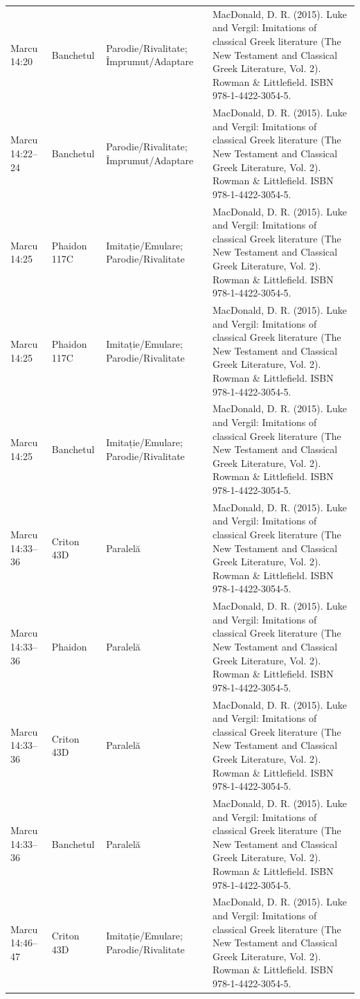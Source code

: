 \documentclass[12pt,a4paper,twoside,openany]{book}
\begin{document}
\begin{longtable}{L{1.4cm}L{1.7cm}L{3.1cm}L{8.4cm}}
Marcu 14:20 & Banchetul & Parodie/Rivalitate; Împrumut/Adaptare & MacDonald, D. R. (2015). Luke and Vergil: Imitations of classical Greek literature (The New Testament and Classical Greek Literature, Vol. 2). Rowman \& Littlefield. ISBN 978-1-4422-3054-5. \\
Marcu 14:22–24 & Banchetul & Parodie/Rivalitate; Împrumut/Adaptare & MacDonald, D. R. (2015). Luke and Vergil: Imitations of classical Greek literature (The New Testament and Classical Greek Literature, Vol. 2). Rowman \& Littlefield. ISBN 978-1-4422-3054-5. \\
Marcu 14:25 & Phaidon 117C & Imitație/Emulare; Parodie/Rivalitate & MacDonald, D. R. (2015). Luke and Vergil: Imitations of classical Greek literature (The New Testament and Classical Greek Literature, Vol. 2). Rowman \& Littlefield. ISBN 978-1-4422-3054-5. \\
Marcu 14:25 & Phaidon 117C & Imitație/Emulare; Parodie/Rivalitate & MacDonald, D. R. (2015). Luke and Vergil: Imitations of classical Greek literature (The New Testament and Classical Greek Literature, Vol. 2). Rowman \& Littlefield. ISBN 978-1-4422-3054-5. \\
Marcu 14:25 & Banchetul & Imitație/Emulare; Parodie/Rivalitate & MacDonald, D. R. (2015). Luke and Vergil: Imitations of classical Greek literature (The New Testament and Classical Greek Literature, Vol. 2). Rowman \& Littlefield. ISBN 978-1-4422-3054-5. \\
Marcu 14:33–36 & Criton 43D & Paralelă & MacDonald, D. R. (2015). Luke and Vergil: Imitations of classical Greek literature (The New Testament and Classical Greek Literature, Vol. 2). Rowman \& Littlefield. ISBN 978-1-4422-3054-5. \\
Marcu 14:33–36 & Phaidon & Paralelă & MacDonald, D. R. (2015). Luke and Vergil: Imitations of classical Greek literature (The New Testament and Classical Greek Literature, Vol. 2). Rowman \& Littlefield. ISBN 978-1-4422-3054-5. \\
Marcu 14:33–36 & Criton 43D & Paralelă & MacDonald, D. R. (2015). Luke and Vergil: Imitations of classical Greek literature (The New Testament and Classical Greek Literature, Vol. 2). Rowman \& Littlefield. ISBN 978-1-4422-3054-5. \\
Marcu 14:33–36 & Banchetul & Paralelă & MacDonald, D. R. (2015). Luke and Vergil: Imitations of classical Greek literature (The New Testament and Classical Greek Literature, Vol. 2). Rowman \& Littlefield. ISBN 978-1-4422-3054-5. \\
Marcu 14:46–47 & Criton 43D & Imitație/Emulare; Parodie/Rivalitate & MacDonald, D. R. (2015). Luke and Vergil: Imitations of classical Greek literature (The New Testament and Classical Greek Literature, Vol. 2). Rowman \& Littlefield. ISBN 978-1-4422-3054-5. \\

\end{longtable}
\end{document}
